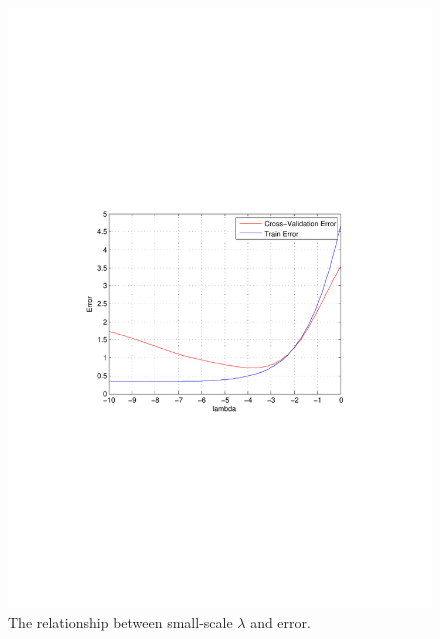 \documentclass[letterpaper,12pt]{article}
\numberwithin{equation}{section}
\begin{document}
\begin{figure}[H]
\vspace{-8.5cm}
 
\centering
      \includegraphics[scale=0.8]{-10-0}
\vspace{-8.3cm}
\caption{\label{fig:small_scale} 
The relationship between small-scale $\lambda$ and error.}
       
\end{figure}
\end{document}
